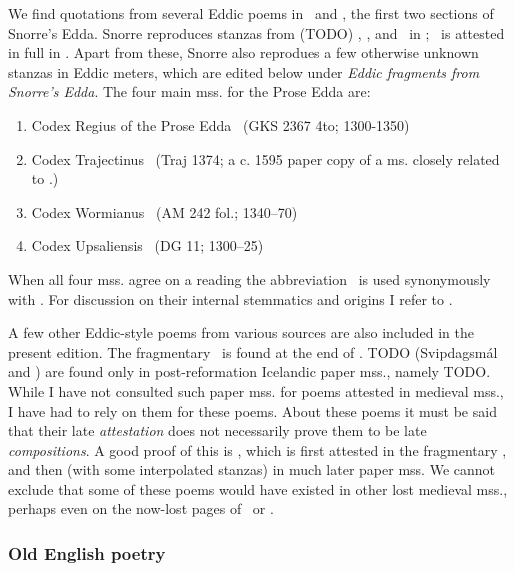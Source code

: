     We find quotations from several Eddic poems in \Gylfaginning\ and \Skaldskaparmal, the first two sections of Snorre’s Edda.  Snorre reproduces stanzas from (TODO) \Voluspa, \Vafthrudnismal, and \Grimnismal\ in \Gylfaginning; \Grottasongr\ is attested in full in \Skaldskaparmal.  Apart from these, Snorre also reprodues a few otherwise unknown stanzas in Eddic meters, which are edited below under \emph{Eddic fragments from Snorre’s Edda}.  The four main mss. for the Prose Edda are:%

    \begin{enumerate}
      \item Codex Regius of the Prose Edda \RegiusProse\ (GKS 2367 4to; 1300-1350)
      \item Codex Trajectinus \Trajectinus\ (Traj 1374; a c. 1595 paper copy of a ms. closely related to \RegiusProse.)
      \item Codex Wormianus \Wormianus\ (AM 242 fol.; 1340–70)
      \item Codex Upsaliensis \Upsaliensis\ (DG 11; 1300–25)
    \end{enumerate}

    When all four mss. agree on a reading the abbreviation \GylfMS\ is used synonymously with \RegiusProse\Trajectinus\Wormianus\Upsaliensis.  For discussion on their internal stemmatics and origins I refer to \textcite{Haukur2017}.


    A few other Eddic-style poems from various sources are also included in the present edition.  The fragmentary \Rigsthula\ is found at the end of \Wormianus.  TODO (Svipdagsmál and \Grougaldr) are found only in post-reformation Icelandic paper mss., namely TODO.  While I have not consulted such paper mss. for poems attested in medieval mss., I have had to rely on them for these poems.  About these poems it must be said that their late \emph{attestation} does not necessarily prove them to be late \emph{compositions}.  A good proof of this is \Baldrsdraumar, which is first attested in the fragmentary \AM, and then (with some interpolated stanzas) in much later paper mss.  We cannot exclude that some of these poems would have existed in other lost medieval mss., perhaps even on the now-lost pages of \Regius\ or \AM.

    \subsubsection{Old English poetry}


